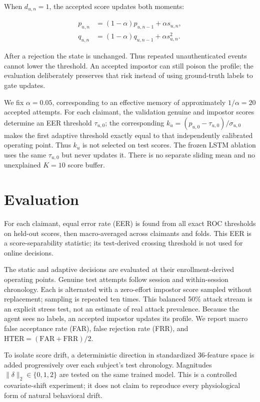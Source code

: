 \documentclass[3p,times,procedia]{elsarticle}
\begin{document}
When $d_{u,n}=1$, the accepted score updates both moments:

\begin{align}
p_{u,n} &= (1-\alpha)p_{u,n-1}+\alpha s_{u,n},\\
q_{u,n} &= (1-\alpha)q_{u,n-1}+\alpha s_{u,n}^{2}.
\end{align}

After a rejection the state is unchanged. Thus repeated unauthenticated events
cannot lower the threshold. An accepted impostor can still poison the profile;
the evaluation deliberately preserves that risk instead of using ground-truth
labels to gate updates.

We fix $\alpha=0.05$, corresponding to an effective memory of approximately
$1/\alpha=20$ accepted attempts. For each claimant, the validation genuine and
impostor scores determine an EER threshold $\tau_{u,0}$; the corresponding
$k_u=(p_{u,0}-\tau_{u,0})/\sigma_{u,0}$ makes the first adaptive threshold
exactly equal to that independently calibrated operating point. Thus $k_u$ is
not selected on test scores. The frozen LSTM ablation uses the same
$\tau_{u,0}$ but never updates it. There is no separate sliding mean and no
unexplained $K=10$ score buffer.

\section{Evaluation}
\label{sec:evaluation}

For each claimant, equal error rate (EER) is found from all exact ROC thresholds
on held-out scores, then macro-averaged across claimants and folds. This EER is a
score-separability statistic; its test-derived crossing threshold is not used
for online decisions.

The static and adaptive decisions are evaluated at their enrollment-derived
operating points. Genuine test attempts follow session and within-session
chronology. Each is alternated with a zero-effort impostor score sampled without
replacement; sampling is repeated ten times. This balanced 50\% attack stream is
an explicit stress test, not an estimate of real attack prevalence. Because the
agent sees no labels, an accepted impostor updates its profile. We report macro
false acceptance rate (FAR), false rejection rate (FRR), and
$\mathrm{HTER}=(\mathrm{FAR}+\mathrm{FRR})/2$.

To isolate score drift, a deterministic direction in standardized 36-feature
space is added progressively over each subject's test chronology. Magnitudes
$\lVert\delta\rVert_2\in\{0,1,2\}$ are tested on the same trained model. This is
a controlled covariate-shift experiment; it does not claim to reproduce every
physiological form of natural behavioral drift.
\end{document}
